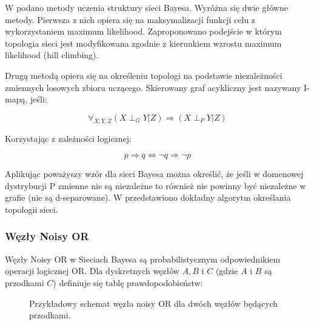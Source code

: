 \documentclass[12pt]{article}
\begin{document}
W \cite{PhD} podano metody uczenia struktury sieci Bayesa. Wyróżna się dwie główne metody. Pierwsza z nich opiera się na maksymalizacji funkcji celu z wykorzystaniem maximum likelihood. Zaproponowano podejście w którym topologia sieci jest modyfikowana zgodnie z kierunkiem wzrostu maximum likelihood (hill climbing).

Drugą metodą opiera się na określeniu topologi na podstawie niezależności zmiennych losowych zbioru uczącego. Skierowany graf acykliczny jest nazywany I-mapą, jeśli:

\begin{equation}
	\forall_{X, Y, Z} (X \perp_G Y| Z) 	\Rightarrow  (X \perp_P Y | Z)
\end{equation}

Korzystając z zależności logicznej:

\begin{equation}
	p \Rightarrow q \Leftrightarrow \neg q \Rightarrow \neg p
\end{equation}

Aplikując poważyszy wzór dla sieci Bayesa można określić, że jeśli w domenowej dystrybucji P zmienne nie są niezależne to również nie powinny być niezależne w grafie (nie są d-separowane). W \cite{PhD} przedstawiono dokładny algorytm określania topologii sieci.

\subsubsection{Węzły Noisy OR}

Węzły Noisy OR w Sieciach Bayesa są probabilistycznym odpowiednikiem operacji logicznej OR. Dla dyskretnych węzłów $A, B$ i $C$ (gdzie $A$ i $B$ są przodkami $C$) definiuje się tablę prawdopodobieństw:

\begin{figure}[H]
\centering
{}
\caption{Przykładowy schemat węzła noisy OR dla dwóch węzłów będących przodkami.}
\end{figure}
\end{document}
